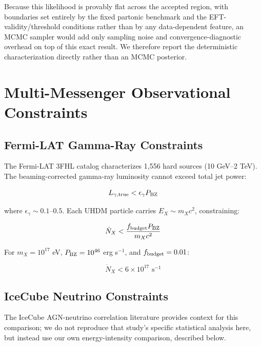 \documentclass[twocolumn,superscriptaddress,prd,nofootinbib]{revtex4-2}
\begin{document}
Because this likelihood is provably flat across the accepted region, with boundaries set entirely by the fixed partonic benchmark and the EFT-validity/threshold conditions rather than by any data-dependent feature, an MCMC sampler would add only sampling noise and convergence-diagnostic overhead on top of this exact result. We therefore report the deterministic characterization directly rather than an MCMC posterior.

\section{Multi-Messenger Observational Constraints}
\label{sec:constraints}

\subsection{Fermi-LAT Gamma-Ray Constraints}

The Fermi-LAT 3FHL catalog \citep{Ajello2017} characterizes 1,556 hard sources (10 GeV--2 TeV). The beaming-corrected gamma-ray luminosity cannot exceed total jet power:

\begin{equation}
L_{\gamma,\rm true} < \epsilon_\gamma P_{\rm BZ}
\label{eq:energy_budget}
\end{equation}

where $\epsilon_\gamma \sim 0.1$--$0.5$. Each UHDM particle carries $E_X \sim m_X c^2$, constraining:

\begin{equation}
\dot{N}_X < \frac{f_{\rm budget} P_{\rm BZ}}{m_X c^2}
\label{eq:UHDM_energy_budget}
\end{equation}

For $m_X = 10^{17}$ eV, $P_{\rm BZ} = 10^{46}$ erg s$^{-1}$, and $f_{\rm budget} = 0.01$:

\begin{equation}
\dot{N}_X < 6 \times 10^{17} \text{ s}^{-1}
\label{eq:Ndot_limit}
\end{equation}

\subsection{IceCube Neutrino Constraints}

The IceCube AGN-neutrino correlation literature \citep{IceCube2024} provides context for this comparison; we do not reproduce that study's specific statistical analysis here, but instead use our own energy-intensity comparison, described below.
\end{document}

